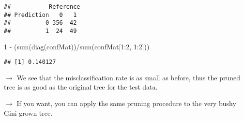 \documentclass[
  10pt,
  ignorenonframetext,
]{beamer}
\newenvironment{Shaded}{\begin{snugshade}}{\end{snugshade}}
\newcommand{\AttributeTok}[1]{\textcolor[rgb]{0.77,0.63,0.00}{#1}}
\newcommand{\DecValTok}[1]{\textcolor[rgb]{0.00,0.00,0.81}{#1}}
\newcommand{\FunctionTok}[1]{\textcolor[rgb]{0.00,0.00,0.00}{#1}}
\newcommand{\NormalTok}[1]{#1}
\newcommand{\OtherTok}[1]{\textcolor[rgb]{0.56,0.35,0.01}{#1}}
\newcommand{\SpecialCharTok}[1]{\textcolor[rgb]{0.00,0.00,0.00}{#1}}
\newcommand{\StringTok}[1]{\textcolor[rgb]{0.31,0.60,0.02}{#1}}
\begin{document}
\begin{frame}[fragile]
\scriptsize

\begin{Shaded}
\end{Shaded}

\begin{verbatim}
##           Reference
## Prediction   0   1
##          0 356  42
##          1  24  49
\end{verbatim}

\begin{Shaded}
\begin{Highlighting}[]
\DecValTok{1} \SpecialCharTok{{-}}\NormalTok{ (}\FunctionTok{sum}\NormalTok{(}\FunctionTok{diag}\NormalTok{(confMat))}\SpecialCharTok{/}\FunctionTok{sum}\NormalTok{(confMat[}\DecValTok{1}\SpecialCharTok{:}\DecValTok{2}\NormalTok{, }\DecValTok{1}\SpecialCharTok{:}\DecValTok{2}\NormalTok{]))}
\end{Highlighting}
\end{Shaded}

\begin{verbatim}
## [1] 0.140127
\end{verbatim}

\normalsize

\vspace{4mm}

\(\rightarrow\) We see that the misclassification rate is as small as
before, thus the pruned tree is as good as the original tree for the
test data.

\vspace{2mm}

\(\rightarrow\) If you want, you can apply the same pruning procedure to
the very bushy Gini-grown tree.
\end{frame}
\end{document}
